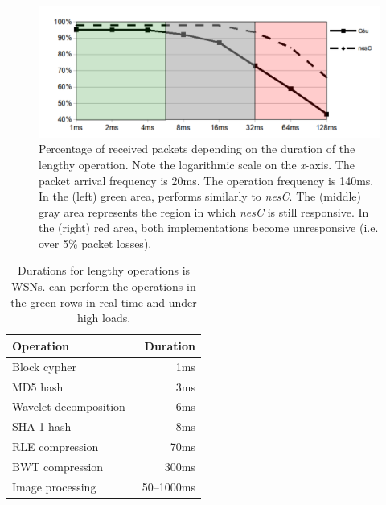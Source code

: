 \begin{figure}[t]
\includegraphics[width=\linewidth,clip=true,trim=35px 0px 10px 0px]{radio1}
\caption{ Percentage of received packets depending on the duration of the 
lengthy operation.  \newline
{\small %
Note the logarithmic scale on the \emph{x}-axis.
The packet arrival frequency is 20ms.
The operation frequency is 140ms.
In the (left) green area, \CEU performs similarly to \emph{nesC}.
The (middle) gray area represents the region in which \emph{nesC} is still 
responsive.
In the (right) red area, both implementations become unresponsive (i.e. over 
5\% packet losses).
}%
\label{fig.radio1}
}
\end{figure}


\begin{table}[t]
\begin{center}
\begin{tabular}{ | l | r | }
\hline
\rowcolor{darkgray}
    Operation          & Duration  \\ \hline
\hline
\rowcolor{lightgreen}
    Block cypher~\cite{wsn.tinysec,wsn.crypto}  & 1ms           \\ \hline
\rowcolor{lightgreen}
    MD5 hash~\cite{wsn.crypto}                  & 3ms           \\ \hline
\rowcolor{lightgreen}
    Wavelet decomposition~\cite{wsn.wavelet}    & 6ms           \\ \hline
\hline
\rowcolor{lightred}
    SHA-1 hash~\cite{wsn.crypto}                & 8ms           \\ \hline
\rowcolor{lightred}
    RLE compression~\cite{wsn.compression}      & 70ms          \\ \hline
\rowcolor{lightred}
    BWT compression~\cite{wsn.compression}      & 300ms         \\ \hline
\rowcolor{lightred}
    Image processing~\cite{wsn.cyclops}         & 50--1000ms    \\ \hline
\end{tabular}
\caption{Durations for lengthy operations is WSNs. \newline
{\small %
\CEU can perform the operations in the green rows in real-time and under high 
loads.
}%
\label{tab.durs}
}
\end{center}
\end{table}

